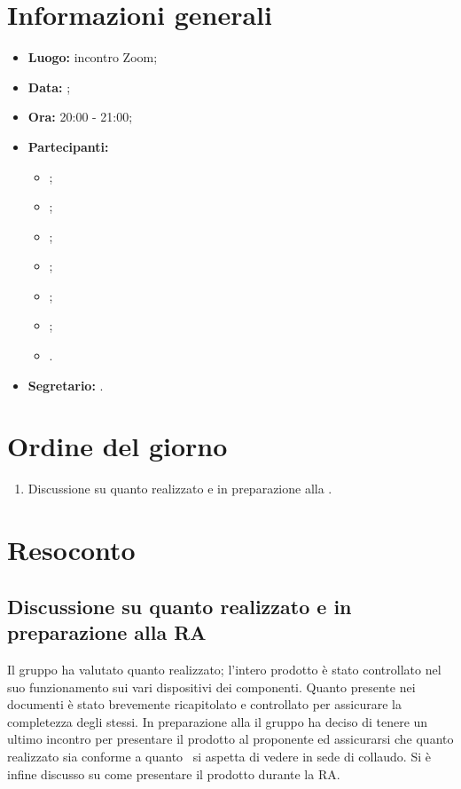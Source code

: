 \section{Informazioni generali}
\begin{itemize}
	\item \textbf{Luogo:} incontro Zoom;
	\item \textbf{Data:} \Data;
	\item \textbf{Ora:} 20:00 - 21:00;
	\item \textbf{Partecipanti:}
	\begin{itemize}
		\item \BL{}; 
		\item \FF{};
		\item \MM{}; 
		\item \PC{};
		\item \TG{};
		\item \TL{};
		\item \VD{}.
	\end{itemize} 
	\item \textbf{Segretario:} \FF{}.
\end{itemize}

\section{Ordine del giorno}
\begin{enumerate}
	\item Discussione su quanto realizzato e in preparazione alla .
\end{enumerate}

\section{Resoconto}
\subsection{Discussione su quanto realizzato e in preparazione alla RA}
Il gruppo ha valutato quanto realizzato; l'intero prodotto è stato controllato nel suo funzionamento sui vari dispositivi dei componenti. Quanto presente nei documenti è stato brevemente ricapitolato e controllato per assicurare la completezza degli stessi. In preparazione alla  il gruppo ha deciso di tenere un ultimo incontro per presentare il prodotto al proponente ed assicurarsi che quanto realizzato sia conforme a quanto \Proponente\ si aspetta di vedere in sede di collaudo. Si è infine discusso su come presentare il prodotto durante la RA. 

